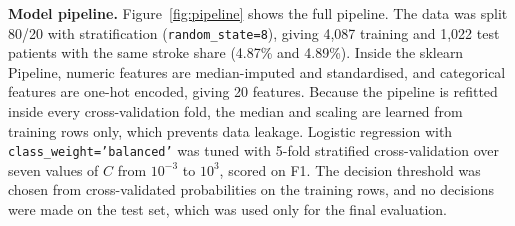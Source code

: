 \textbf{Model pipeline.}
Figure~\ref{fig:pipeline} shows the full pipeline.
The data was split 80/20 with stratification (\texttt{random\_state=8}), giving 4,087 training and 1,022 test patients with the same stroke share (4.87\% and 4.89\%).
Inside the sklearn Pipeline, numeric features are median-imputed and standardised, and categorical features are one-hot encoded, giving 20 features.
Because the pipeline is refitted inside every cross-validation fold, the median and scaling are learned from training rows only, which prevents data leakage.
Logistic regression with \texttt{class\_weight='balanced'} was tuned with 5-fold stratified cross-validation over seven values of $C$ from $10^{-3}$ to $10^{3}$, scored on F1.
The decision threshold was chosen from cross-validated probabilities on the training rows, and no decisions were made on the test set, which was used only for the final evaluation.
